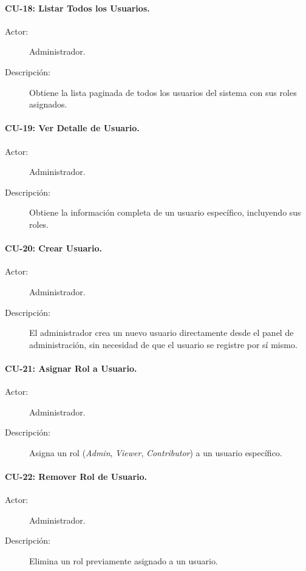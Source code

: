 \paragraph{CU-18: Listar Todos los Usuarios.}
\begin{description}
    \item[Actor:] Administrador.
    \item[Descripción:] Obtiene la lista paginada de todos los usuarios del sistema con sus roles asignados.
\end{description}

\paragraph{CU-19: Ver Detalle de Usuario.}
\begin{description}
    \item[Actor:] Administrador.
    \item[Descripción:] Obtiene la información completa de un usuario específico, incluyendo sus roles.
\end{description}

\paragraph{CU-20: Crear Usuario.}
\begin{description}
    \item[Actor:] Administrador.
    \item[Descripción:] El administrador crea un nuevo usuario directamente desde el panel de administración, sin necesidad de que el usuario se registre por sí mismo.
\end{description}

\paragraph{CU-21: Asignar Rol a Usuario.}
\begin{description}
    \item[Actor:] Administrador.
    \item[Descripción:] Asigna un rol (\textit{Admin}, \textit{Viewer}, \textit{Contributor}) a un usuario específico.
\end{description}

\paragraph{CU-22: Remover Rol de Usuario.}
\begin{description}
    \item[Actor:] Administrador.
    \item[Descripción:] Elimina un rol previamente asignado a un usuario.
\end{description}

